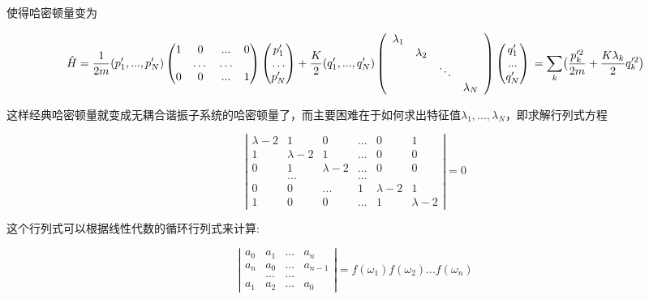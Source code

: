 使得哈密顿量变为

\begin{equation}
    \hat{H}= \frac{1}{2m}(p'_1,...,p'_N)\left(\begin{matrix}
        1 & 0 & ... & 0 \\
            & \dots & \dots \\
        0 & 0 & ... & 1
    \end{matrix}\right) \left(\begin{matrix}
        p'_1 \\ \dots \\ p'_N
    \end{matrix}\right)
    +\frac{K}{2}(q'_1,...,q'_N) \left(\begin{array}{cccc}
        \lambda_1 & & & \\
            & \lambda_2 & & \\
            & & \ddots & \\
            & & & \lambda_N
    \end{array}\right) \left(\begin{matrix}
        q'_1 \\ ... \\ q'_N
    \end{matrix}\right) \\ =\sum_k\bigl(\frac{p'^2_k}{2m}+\frac{K\lambda_k}{2}q'^2_k\bigr)
\end{equation}

这样经典哈密顿量就变成无耦合谐振子系统的哈密顿量了，而主要困难在于如何求出特征值$\lambda_1,...,\lambda_N$，即求解行列式方程

\begin{equation}
    \left|\begin{matrix}
        \lambda-2 & 1 & 0 & ... & 0 & 1 \\
        1 & \lambda-2 & 1 & ... & 0 & 0 \\
        0 & 1 & \lambda-2 & ... & 0 & 0 \\
        & \dots & & \dots &   \\
        0 & 0 & ... & 1 & \lambda-2 & 1 \\
        1 & 0 & 0 & ... & 1 & \lambda-2
    \end{matrix} \right|=0
\end{equation}

这个行列式可以根据线性代数的循环行列式来计算:

\begin{equation}
    \left| \begin{matrix}
        a_0 & a_1 & ... & a_n \\
        a_n & a_0 & ... & a_{n-1} \\
         & ... & ... & \\
        a_1 & a_2 & ... & a_0
    \end{matrix} \right| = f(\omega_1)f(\omega_2)...f(\omega_n)
\end{equation}


